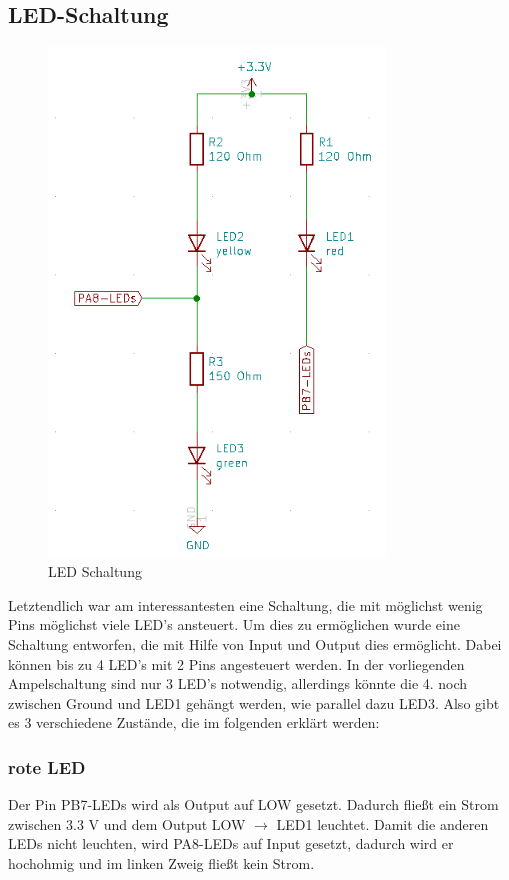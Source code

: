 \documentclass[a4paper,
DIV=13,
12pt,
BCOR=10mm,
department=FakEI,
parskip=half,
automark,
]{article}
\begin{document}
\subsection{LED-Schaltung}
\begin{figure}[!hbpt]
 \begin{center} \includegraphics[width=0.8\textwidth]{LED_Schaltung.png}
 \caption{LED Schaltung}
 \label{fig:Register}
  \end{center}
\end{figure}

\newpage

Letztendlich war am interessantesten eine Schaltung, die mit möglichst wenig Pins möglichst viele LED's ansteuert. Um dies zu ermöglichen wurde eine Schaltung entworfen, die mit Hilfe von Input und Output dies ermöglicht. Dabei können bis zu 4 LED's mit 2 Pins angesteuert werden. In der vorliegenden Ampelschaltung sind nur 3 LED's notwendig, allerdings könnte die 4. noch zwischen Ground und LED1 gehängt werden, wie parallel dazu LED3. Also gibt es 3 verschiedene Zustände, die im folgenden erklärt werden:
\subsubsection{rote LED}
Der Pin \glqq PB7-LEDs\grqq{} wird als Output auf \glqq LOW\grqq{} gesetzt. Dadurch fließt ein Strom zwischen 3.3 V und dem Output \glqq LOW\grqq{} $\rightarrow$ LED1 leuchtet. Damit die anderen LEDs nicht leuchten, wird \glqq PA8-LEDs\grqq{} auf Input gesetzt, dadurch wird er hochohmig und im linken Zweig fließt kein Strom.
\end{document}
